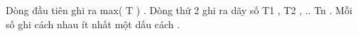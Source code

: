 Dòng đầu tiên ghi ra max( T ) . Dòng thứ 2 ghi ra dãy số T1 , T2 , .. Tn . Mỗi số ghi cách nhau ít nhất một dấu cách .